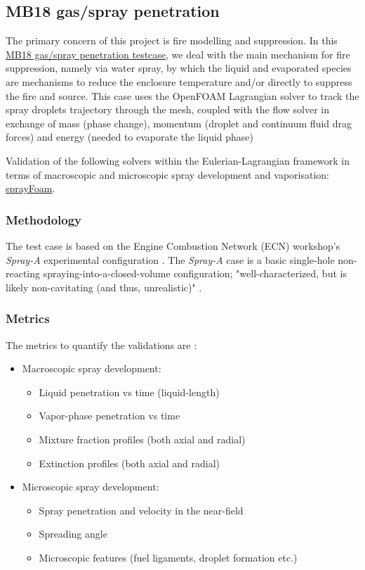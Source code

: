 \subsection{MB18 gas/spray penetration}
The primary concern of this project is fire modelling and suppression. In this \href{https://develop.openfoam.com/exafoam/wp2-validation/-/tree/master/lagrangian/sprayFoam/gasSprayPenetration?ref_type=heads}{MB18 gas/spray penetration testcase}, we deal with the main mechanism for fire suppression, namely via water spray, by which the liquid and evaporated species are mechanisms to reduce the enclosure temperature and/or directly to suppress the fire and source. This case uses the OpenFOAM Lagrangian solver to track the spray droplets trajectory through the mesh, coupled with the flow solver in exchange of mass (phase change), momentum (droplet and continuum fluid drag forces) and energy (needed to evaporate the liquid phase)

Validation of the following solvers within the Eulerian-Lagrangian framework
in terms of macroscopic and microscopic spray development and vaporisation:
\href{https://develop.openfoam.com/Development/openfoam/-/tree/master/applications/solvers/lagrangian/sprayFoam/sprayFoam.C}{sprayFoam}.

\subsubsection*{Methodology}
The test case is based on the Engine Combustion Network (ECN) workshop's \textit{Spray-A} experimental configuration \cite{ref1}. The \textit{Spray-A} case is a basic single-hole non-reacting spraying-into-a-closed-volume configuration; "well-characterized, but is likely non-cavitating (and thus, unrealistic)" \cite{ref2}.

\subsubsection*{Metrics}
The metrics to quantify the validations are \cite{ref3}:
\begin{itemize}
    \item Macroscopic spray development:
    \begin{itemize}
        \item Liquid penetration vs time (liquid-length)
        \item Vapor-phase penetration vs time
        \item Mixture fraction profiles (both axial and radial)
        \item Extinction profiles (both axial and radial)
    \end{itemize}
    \item Microscopic spray development:
    \begin{itemize}
        \item Spray penetration and velocity in the near-field
        \item Spreading angle
        \item Microscopic features (fuel ligaments, droplet formation etc.)
    \end{itemize}
\end{itemize}

